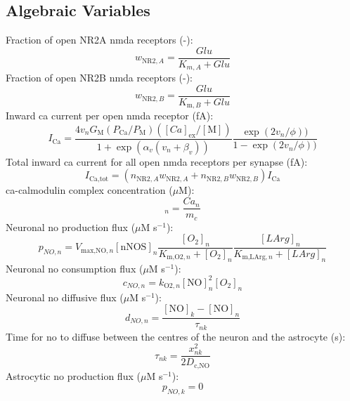 \documentclass[11pt]{elsarticle}
\newcommand{\mus}{$\mu$M s$^{-1}$\xspace}
\newcommand{\uM}{$\mu$M\xspace}
\newcommand{\ca}{\gls{ca}\xspace}
\begin{document}
		\subsection{Algebraic Variables}
%
Fraction of open NR2A \gls{nmda} receptors (-): 
\begin{equation} 
w_{\text{NR2},A} = \frac{Glu}{K_{m,A} + Glu}
\end{equation}	
%
Fraction of open NR2B \gls{nmda} receptors (-):
\begin{equation} 
w_{\text{NR2},B} = \frac{Glu}{K_{\text{m},B} + Glu}
\end{equation}	
%
Inward \ca current per open \gls{nmda} receptor (fA):	
\begin{equation} 
I_{\text{Ca}} = \frac{4 v_n G_\text{M} (P_{\text{Ca}}/P_\text{M})([Ca]_{\text{ex}}/[\text{M}])}{1+ \exp(\alpha_v(v_n+\beta_v))} \frac{\exp(2v_n/\phi))}{1-\exp(2v_n/\phi))}
\end{equation}
%
Total inward \ca current for all open \gls{nmda} receptors per synapse (fA): 
\begin{equation} 
I_{\text{Ca,tot}} = (n_{\text{NR2},A} w_{\text{NR2},A} + n_{\text{NR2},B}  w_{\text{NR2},B}) I_{\text{Ca}} 
\end{equation}	
%
\ca-calmodulin complex concentration (\uM):
\begin{equation} 
[\text{CaM}]_n = \frac{Ca_n}{m_c}
\end{equation}
%
Neuronal \gls{no} production flux (\mus): 	
\begin{equation} 
p_{NO,n} = V_{\text{max,NO},n} [\text{nNOS}]_n \frac{[O_2]_n}{K_{\text{m,O2},n}+[O_2]_n} \frac{[LArg]_n}{K_{\text{m,LArg},n}+[LArg]_n}
\end{equation}	
%
Neuronal \gls{no} consumption flux (\mus): 				
\begin{equation} 
c_{NO,n} = k_{\text{O2},n} [\text{NO}]_n^2 [O_2]_n
\end{equation}
%
Neuronal \gls{no} diffusive flux (\mus): 	
\begin{equation} 
d_{NO,n} = \frac{[\text{NO}]_k - [\text{NO}]_n}{\tau_{nk}}
\end{equation}	
%
Time for \gls{no} to diffuse between the centres of the neuron and the astrocyte (s):
\begin{equation}
\tau_{nk} = \frac{x_{nk}^2}{2 D_{\text{c,NO}}}
\end{equation}
%
Astrocytic \gls{no} production flux (\mus):
\begin{equation} 
p_{NO,k} = 0
\end{equation}
\end{document}
